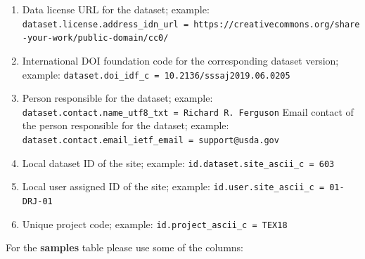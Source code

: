 \documentclass[
  graybox,natbib,nospthms]{svmono}
\begin{document}
\begin{enumerate}
\item
  Data license URL for the dataset; example: \texttt{dataset.license.address\_idn\_url\ =\ \textquotesingle{}https://creativecommons.org/share-your-work/public-domain/cc0/\textquotesingle{}}\\
\item
  International DOI foundation code for the corresponding dataset version; example: \texttt{dataset.doi\_idf\_c\ =\ \textquotesingle{}10.2136/sssaj2019.06.0205\textquotesingle{}}\\
\item
  Person responsible for the dataset; example: \texttt{dataset.contact.name\_utf8\_txt\ =\ \textquotesingle{}Richard\ R.\ Ferguson\textquotesingle{}}
  Email contact of the person responsible for the dataset; example: \texttt{dataset.contact.email\_ietf\_email\ =\ \textquotesingle{}support@usda.gov\textquotesingle{}}\\
\item
  Local dataset ID of the site; example: \texttt{id.dataset.site\_ascii\_c\ =\ \textquotesingle{}603\textquotesingle{}}\\
\item
  Local user assigned ID of the site; example: \texttt{id.user.site\_ascii\_c\ =\ \textquotesingle{}01-DRJ-01\textquotesingle{}}\\
\item
  Unique project code; example: \texttt{id.project\_ascii\_c\ =\ \textquotesingle{}TEX18\textquotesingle{}}\\
\end{enumerate}

For the \textbf{samples} table please use some of the columns:
\end{document}

